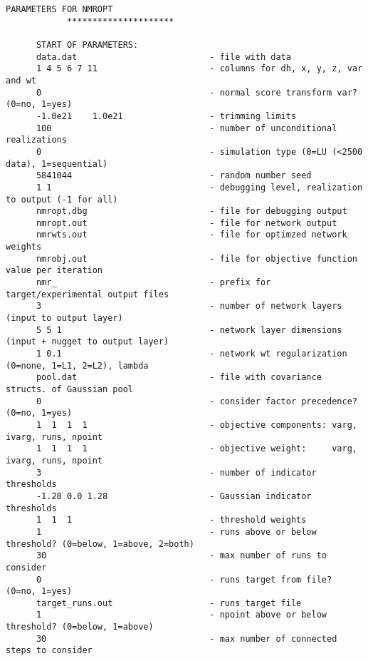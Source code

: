 \begin{framed}
   \begin{lstlisting}[style=ccgParameterfile]
            PARAMETERS FOR NMROPT
            *********************

      START OF PARAMETERS:
      data.dat                          - file with data
      1 4 5 6 7 11                      - columns for dh, x, y, z, var and wt
      0                                 - normal score transform var? (0=no, 1=yes)
      -1.0e21    1.0e21                 - trimming limits
      100                               - number of unconditional realizations
      0                                 - simulation type (0=LU (<2500 data), 1=sequential)
      5841044                           - random number seed
      1 1                               - debugging level, realization to output (-1 for all)
      nmropt.dbg                        - file for debugging output
      nmropt.out                        - file for network output
      nmrwts.out                        - file for optimzed network weights
      nmrobj.out                        - file for objective function value per iteration
      nmr_                              - prefix for target/experimental output files
      3                                 - number of network layers (input to output layer)
      5 5 1                             - network layer dimensions (input + nugget to output layer)
      1 0.1                             - network wt regularization (0=none, 1=L1, 2=L2), lambda
      pool.dat                          - file with covariance structs. of Gaussian pool
      0                                 - consider factor precedence? (0=no, 1=yes)
      1  1  1  1                        - objective components: varg, ivarg, runs, npoint
      1  1  1  1                        - objective weight:     varg, ivarg, runs, npoint
      3                                 - number of indicator thresholds
      -1.28 0.0 1.28                    - Gaussian indicator thresholds
      1  1  1                           - threshold weights 
      1                                 - runs above or below threshold? (0=below, 1=above, 2=both)
      30                                - max number of runs to consider
      0                                 - runs target from file? (0=no, 1=yes)
      target_runs.out                   - runs target file
      1                                 - npoint above or below threshold? (0=below, 1=above)
      30                                - max number of connected steps to consider

\end{lstlisting}
\end{framed}
